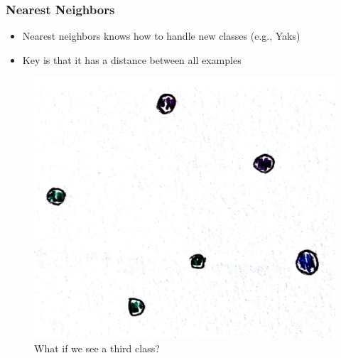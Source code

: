 \documentclass[10pt,mathserif]{beamer}
\begin{document}
\begin{frame}
  \frametitle{Nearest Neighbors}
 \begin{itemize}
 \item Nearest neighbors knows how to handle new classes (e.g., Yaks)
 \item Key is that it has a distance between all examples
 \end{itemize} 
\begin{figure}[ht]
  \centering
  \includegraphics[width=0.40\paperwidth]{figure/nneighbor_3}
  \caption{What if we see a third class? \label{fig:nneighbor_3} }
\end{figure}
\end{frame}
\end{document}

